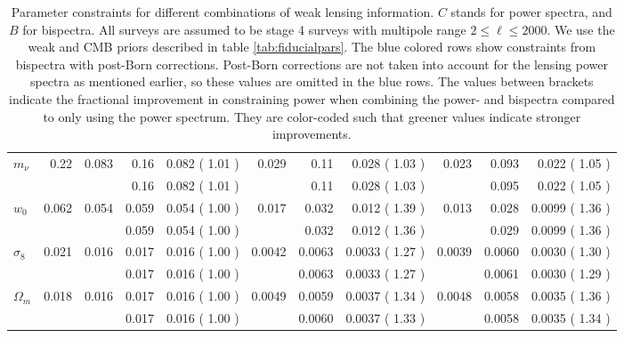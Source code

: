 \documentclass[11pt]{article} %
\newcommand{\greenfactor}[1]{%
    \pgfmathsetmacro{\value}{min(100,round(100*(#1-1)))}%
    \textcolor{green!80!black!\value!black}{#1}%
}
\begin{document}
\begin{table}
\begin{tabular}{|l|r|rrr|rrr|rrr|}
\hline
$m_\nu$    & 0.22 & 0.083 & 0.16 & 0.082 (\greenfactor{1.01}) & 0.029 & 0.11 & 0.028 (\greenfactor{1.03}) & 0.023 & 0.093 & 0.022 (\greenfactor{1.05}) \\
\rowcolor{blue!10}
           &      &       & 0.16 & 0.082 (\greenfactor{1.01}) &       & 0.11 & 0.028 (\greenfactor{1.03}) &       & 0.095 & 0.022 (\greenfactor{1.05}) \\
$w_0$      & 0.062 & 0.054 & 0.059 & 0.054 (\greenfactor{1.00}) & 0.017 & 0.032 & 0.012 (\greenfactor{1.39}) & 0.013 & 0.028 & 0.0099 (\greenfactor{1.36}) \\
\rowcolor{blue!10}
           &       &       & 0.059 & 0.054 (\greenfactor{1.00}) &       & 0.032 & 0.012 (\greenfactor{1.36}) &       & 0.029 & 0.0099 (\greenfactor{1.36}) \\
$\sigma_8$ & 0.021 & 0.016 & 0.017 & 0.016 (\greenfactor{1.00}) & 0.0042 & 0.0063 & 0.0033 (\greenfactor{1.27}) & 0.0039 & 0.0060 & 0.0030 (\greenfactor{1.30}) \\
\rowcolor{blue!10}
           &       &       & 0.017 & 0.016 (\greenfactor{1.00}) &       & 0.0063 & 0.0033 (\greenfactor{1.27}) &       & 0.0061 & 0.0030 (\greenfactor{1.29}) \\
$\Omega_m$ & 0.018 & 0.016 & 0.017 & 0.016 (\greenfactor{1.00}) & 0.0049 & 0.0059 & 0.0037 (\greenfactor{1.34}) & 0.0048 & 0.0058 & 0.0035 (\greenfactor{1.36}) \\
\rowcolor{blue!10}
           &       &       & 0.017 & 0.016 (\greenfactor{1.00}) &       & 0.0060 & 0.0037 (\greenfactor{1.33}) &       & 0.0058 & 0.0035 (\greenfactor{1.34}) \\
\hline
\end{tabular}
\caption{Parameter constraints for different combinations of weak lensing information. $C$ stands for power spectra, and $B$ for bispectra. All surveys are assumed to be stage 4 surveys with multipole range $2 \leq \ell \leq 2000$. We use the weak and CMB priors described in table \ref{tab:fiducialpars}. The blue colored rows show constraints from bispectra with post-Born corrections. Post-Born corrections are not taken into account for the lensing power spectra as mentioned earlier, so these values are omitted in the blue rows. The values between brackets indicate the fractional improvement in constraining power when combining the power- and bispectra compared to only using the power spectrum. They are color-coded such that greener values indicate stronger improvements.}
\label{tab:paramconstraintstight}
\end{table}
\end{document}
